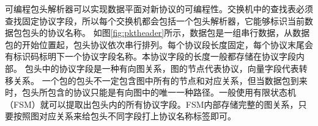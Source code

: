 可编程包头解析器可以实现数据平面对新协议的可编程性。交换机中的查找表必须查找固定协议字段，所以每个交换机都会包括一个包头解析器，它能够标识当前数据包包头的协议名称。
如图\ref{fig:pktheader}所示，数据包是一组串行数据，从数据包的开始位置起，包头协议依次串行排列。每个协议段长度固定，每个协议末尾会有标识码标明下一个协议字段名称。本协议字段的长度一般都存储在协议字段内部。
包头中的协议字段是一种有向图关系，图的节点代表协议，向量字段代表转移关系。
一个包的包头不一定包含图中所有的节点和对应关系，但当数据包到来时，包头所包含的协议只能是有向图中的唯一一种路径。一般使用有限状态机（FSM）就可以提取出包头内的所有协议字段。FSM内部存储完整的图关系，只要按照图对应关系来给包头不同字段打上协议名称标签即可。




